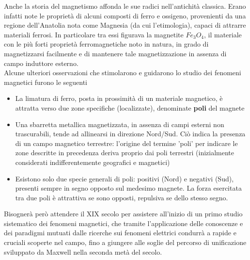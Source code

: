 Anche la storia del magnetismo affonda le sue radici nell'antichità classica. Erano infatti note le proprietà di alcuni composti di ferro e ossigeno, provenienti da una regione dell'Anatolia nota come Magnesia (da cui l'etimologia), capaci di attrarre materiali ferrosi. In particolare tra essi figurava la magnetite $Fe_3 O_4$, il materiale con le più forti proprietà ferromagnetiche noto in natura, in grado di magnetizzarsi facilmente e di mantenere tale magnetizzazione in assenza di campo induttore esterno.
\\Alcune ulteriori osservazioni che stimolarono e guidarono lo studio dei fenomeni magnetici furono le seguenti
\begin{itemize}
\item La limatura di ferro, posta in prossimità di un materiale magnetico, è attratta verso due zone specifiche (localizzate), denominate \textbf{poli} del magnete
\item Una sbarretta metallica magnetizzata, in assenza di campi esterni non trascurabili, tende ad allinearsi in direzione Nord/Sud. Ciò indica la presenza di un campo magnetico terrestre: l'origine del termine 'poli' per indicare le zone descritte in precedenza deriva proprio dai poli terrestri (inizialmente considerati indifferentemente geografici e magnetici)
\item Esistono solo due specie generali di poli: positivi (Nord) e negativi (Sud), presenti sempre in segno opposto sul medesimo magnete. La forza esercitata tra due poli è attrattiva se sono opposti, repulsiva se dello stesso segno.
\end{itemize}

Bisognerà però attendere il XIX secolo per assistere all'inizio di un primo studio sistematico dei fenomeni magnetici, che tramite l'applicazione delle conoscenze e dei paradigmi mutuati dalle ricerche sui fenomeni elettrici condurrà a rapide e cruciali scoperte nel campo, fino a giungere alle soglie del percorso di unificazione sviluppato da Maxwell nella seconda metà del secolo.

